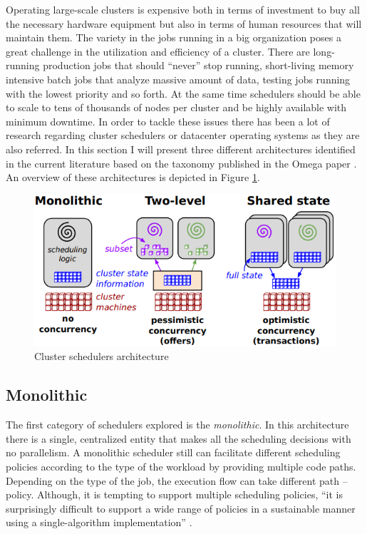 Operating large-scale clusters is expensive both in terms of
investment to buy all the necessary hardware equipment but also in terms of
human resources that will maintain them. The variety in the jobs
running in a big organization poses a great challenge in the
utilization and efficiency of a cluster. There are long-running
production jobs that should ``never'' stop running, short-living
memory intensive batch jobs that analyze massive amount of data,
testing jobs running with the lowest priority and so forth. At the
same time schedulers should be able to scale to tens of thousands of
nodes per cluster and be highly available with minimum downtime. In order
to tackle these issues there has been a lot of research regarding cluster
schedulers or datacenter operating systems as they are also
referred. In this section I will present three different architectures
identified in the current literature based on the taxonomy published
in the Omega paper \cite{41684}. An overview of these architectures is
depicted in Figure \ref{fig:sch_tax}.

\begin{figure}
\centering
\includegraphics[scale=0.6]{resources/images/Background/schedulers_taxonomy.png}
\caption{Cluster schedulers architecture \cite{41684}}
\label{fig:sch_tax}
\end{figure}

\subsection{Monolithic}
\label{ssec:tax_monolithic}
The first category of schedulers explored is the \emph{monolithic}. In
this architecture there is a single, centralized entity that makes all
the scheduling decisions with no parallelism. A monolithic scheduler
still can facilitate different scheduling policies according to the type
of the workload by providing multiple code paths. Depending on the
type of the job, the execution flow can take different path --
policy. Although, it is tempting to support multiple
scheduling policies, ``it is surprisingly difficult to support a wide
range of policies in a sustainable manner using a single-algorithm
implementation'' \cite{41684}.

